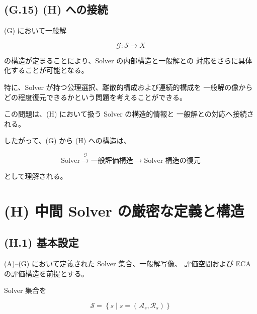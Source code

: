 \documentclass[a4paper,11pt]{article}
\begin{document}
\subsection{(G.15) (H) への接続}
\label{subsec:G15}

(G) において一般解

\begin{equation}
    \mathcal{G}:
    \mathcal{S}\longrightarrow X
\end{equation}

の構造が定まることにより、Solver の内部構造と一般解との
対応をさらに具体化することが可能となる。

特に、Solver が持つ公理選択、離散的構成および連続的構成を
一般解の像からどの程度復元できるかという問題を考えることができる。

この問題は、(H) において扱う Solver の構造的情報と
一般解との対応へ接続される。

したがって、(G) から (H) への構造は、

\begin{equation}
    \boxed{
        \text{Solver}
        \xrightarrow{\mathcal{G}}
        \text{一般評価構造}
        \longrightarrow
        \text{Solver 構造の復元}
    }
\end{equation}

として理解される。


\section{(H) 中間 Solver の厳密な定義と構造}
\label{sec:H}

\subsection{(H.1) 基本設定}
\label{subsec:H1}

(A)--(G) において定義された Solver 集合、一般解写像、
評価空間および ECA の評価構造を前提とする。

Solver 集合を

\begin{equation}
    \mathcal{S}
    =
    \left\{
        s
        \mid
        s=(\mathcal{A}_s,\mathcal{R}_s)
    \right\}
    \label{eq:H-solver}
\end{equation}
\end{document}
